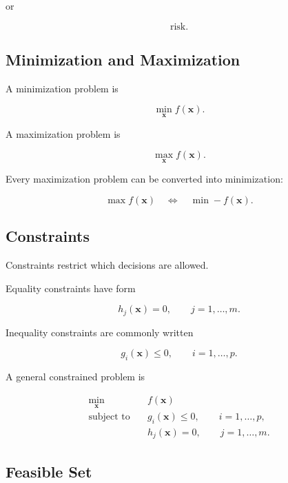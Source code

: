 or

\[
\boxed{
\text{risk}.
}
\]

\subsection{Minimization and Maximization}
\label{subsec:minimization-maximization}

A minimization problem is

\[
\boxed{
\min_{\mathbf{x}}f(\mathbf{x}).
}
\]

A maximization problem is

\[
\boxed{
\max_{\mathbf{x}}f(\mathbf{x}).
}
\]

Every maximization problem can be converted into minimization:

\[
\boxed{
\max f(\mathbf{x})
\quad\Longleftrightarrow\quad
\min -f(\mathbf{x}).
}
\]

\subsection{Constraints}
\label{subsec:optimization-constraints}

Constraints restrict which decisions are allowed.

Equality constraints have form

\[
\boxed{
h_j(\mathbf{x})=0,
\qquad
j=1,\ldots,m.
}
\]

Inequality constraints are commonly written

\[
\boxed{
g_i(\mathbf{x})\leq0,
\qquad
i=1,\ldots,p.
}
\]

A general constrained problem is

\[
\boxed{
\begin{aligned}
\min_{\mathbf{x}}
\quad&
f(\mathbf{x})
\\
\text{subject to}
\quad&
g_i(\mathbf{x})\leq0,
\qquad
i=1,\ldots,p,
\\
&
h_j(\mathbf{x})=0,
\qquad
j=1,\ldots,m.
\end{aligned}
}
\]

\subsection{Feasible Set}
\label{subsec:feasible-set}

